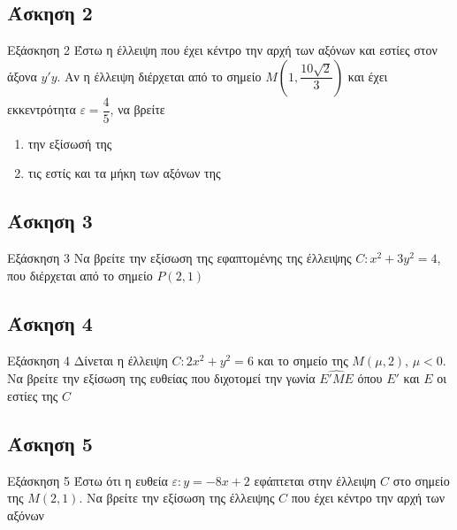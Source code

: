 \documentclass[greek]{beamer}
\begin{document}
\subsection{Άσκηση 2}
\begin{frame}[label=Άσκηση2,t]{Εξάσκηση 2}
 Έστω η έλλειψη που έχει κέντρο την αρχή των αξόνων και εστίες στον άξονα $y'y$. Αν η έλλειψη διέρχεται από το σημείο $Μ\left( 1,\dfrac{10\sqrt{2}}{3} \right) $ και έχει εκκεντρότητα $ε=\dfrac{4}{5}$, να βρείτε
 \begin{enumerate}
  \item<1-> την εξίσωσή της
  \item<2-> τις εστίς και τα μήκη των αξόνων της
 \end{enumerate}

\end{frame}

\subsection{Άσκηση 3}
\begin{frame}[label=Άσκηση3,t]{Εξάσκηση 3}
 Να βρείτε την εξίσωση της εφαπτομένης της έλλειψης $C:x^2+3y^2=4$, που διέρχεται από το σημείο $Ρ(2,1)$

\end{frame}

\subsection{Άσκηση 4}
\begin{frame}[label=Άσκηση4,t]{Εξάσκηση 4}
 Δίνεται η έλλειψη $C:2x^2+y^2=6$ και το σημείο της $Μ(μ,2)$, $μ<0$. Να βρείτε την εξίσωση της ευθείας που διχοτομεί την γωνία $\widehat{Ε'ΜΕ}$ όπου $Ε'$ και $Ε$ οι εστίες της $C$

\end{frame}

\subsection{Άσκηση 5}
\begin{frame}[label=Άσκηση5,t]{Εξάσκηση 5}
 Έστω ότι η ευθεία $ε:y=-8x+2$ εφάπτεται στην έλλειψη $C$ στο σημείο της $Μ(2,1)$. Να βρείτε την εξίσωση της έλλειψης $C$ που έχει κέντρο την αρχή των αξόνων

\end{frame}
\end{document}
